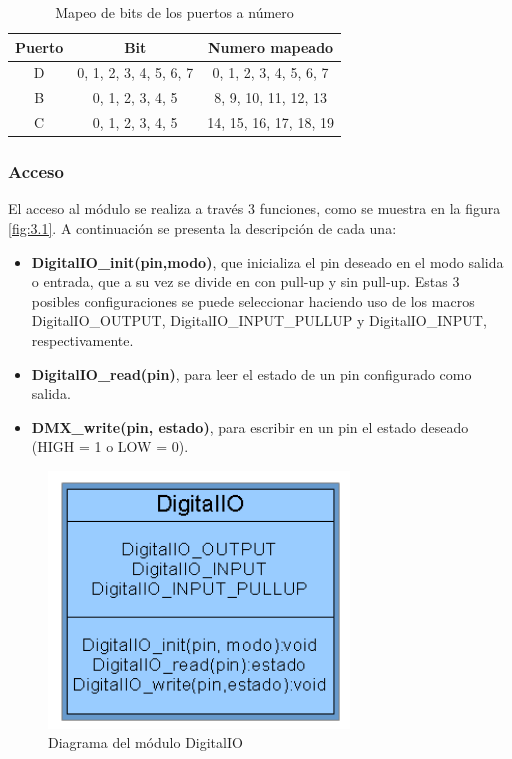 \begin{table}[!ht]
	\begin{center}
		\begin{tabular}{|c|c|c|}
			\hline
			\rowcolor{OODlightblue}
			\textbf{Puerto} & \textbf{Bit} & \textbf{Numero mapeado} \\
			\hline \hline
			D & 0, 1, 2, 3, 4, 5, 6, 7 & 0, 1, 2, 3, 4, 5, 6, 7 \\
			\hline
			B & 0, 1, 2, 3, 4, 5 & 8, 9, 10, 11, 12, 13 \\
			\hline
			C & 0, 1, 2, 3, 4, 5 & 14, 15, 16, 17, 18, 19\\
			\hline
		\end{tabular}
	\end{center}
	\caption{Mapeo de bits de los puertos a número}
	\label{table:\thetable}
\end{table}


\subsubsection{Acceso}
El acceso al módulo se realiza a través 3 funciones, como se muestra en la figura \ref{fig:3.1}. A continuación se presenta la descripción de cada una:
\begin{itemize}
	\item \textbf{DigitalIO\_init(pin,modo)}, que inicializa el pin deseado en el modo salida o entrada, que a su vez se divide en con pull-up y sin pull-up. Estas 3 posibles configuraciones se puede seleccionar haciendo uso de los macros DigitalIO\_OUTPUT, DigitalIO\_INPUT\_PULLUP y DigitalIO\_INPUT, respectivamente.
	\item \textbf{DigitalIO\_read(pin)}, para leer el estado de un pin configurado como salida.
	\item \textbf{DMX\_write(pin, estado)}, para escribir en un pin el estado deseado (HIGH = 1 o LOW = 0).
\end{itemize}

\begin{figure}[!ht]
	\centering
	\includegraphics[width=8cm,scale=1]{resources/3_1-moduloDigitalIO.png}
	\caption{Diagrama del módulo DigitalIO}
	\label{fig:\thefigure}
\end{figure}

